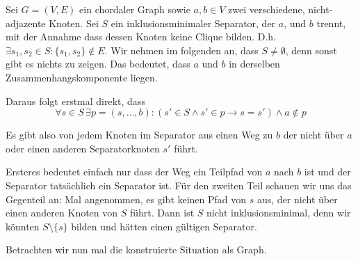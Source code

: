 
\subexercise
\label{sec:sep-clique}

Sei $G = (V,E)$ ein chordaler Graph sowie $a,b \in V$ zwei verschiedene, nicht-adjazente Knoten. Sei $S$ ein inklusionsminimaler Separator, der $a$, und $b$ trennt, mit der Annahme dass dessen Knoten keine Clique bilden. D.h.
$\exists s_1, s_2 \in S \colon \{s_1, s_2\} \notin E$.
Wir nehmen im folgenden an, dass $S \neq \emptyset$, denn sonst gibt es nichts zu zeigen. Das bedeutet, dass $a$ und $b$ in derselben Zusammenhangskomponente liegen.

Daraus folgt erstmal direkt, dass $$\forall s \in S \, \exists p = (s, \dots, b) \colon (s' \in S \wedge s' \in p \rightarrow s = s') \wedge a \notin p$$

Es gibt also von jedem Knoten im Separator aus einen Weg zu $b$ der nicht über $a$ oder einen anderen Separatorknoten $s'$ führt.

Ersteres bedeutet einfach nur dass der Weg ein Teilpfad von $a$ nach $b$ ist und der Separator tatsächlich ein Separator ist. Für den zweiten Teil schauen wir uns das Gegenteil an:
Mal angenommen, es gibt keinen Pfad von $s$ aus, der nicht über einen anderen Knoten von $S$ führt. Dann ist $S$ nicht inklusionsminimal, denn wir könnten $S \setminus \{s\}$ bilden und hätten einen gültigen Separator.

Betrachten wir nun mal die konstruierte Situation als Graph.

